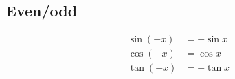 \subsection*{Even/odd}

\begin{align*}
  \sin(-x)  &= - \sin x\\
  \cos(-x)  &= \cos x\\
  \tan(-x)  &= -\tan x
\end{align*}